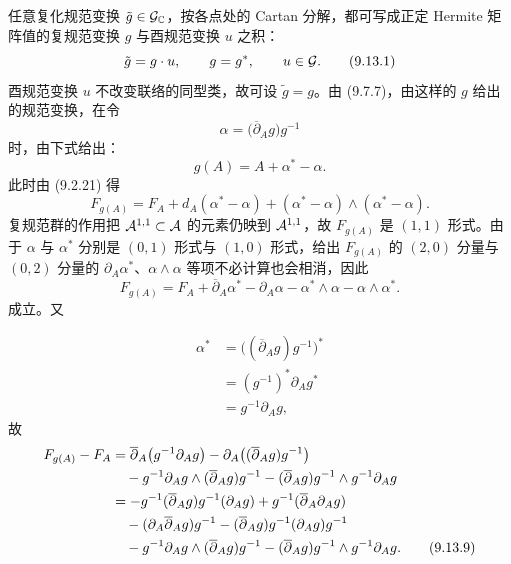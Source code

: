 任意复化规范变换 $\tilde g\in\mathcal{G}_{\mathbb{C}}$，按各点处的 Cartan 分解，都可写成正定 Hermite 矩阵值的复规范变换 $g$ 与酉规范变换 $u$ 之积：
\begin{equation}
  \tilde g=g\cdot u,\qquad g=g^*,\qquad u\in\mathcal{G}.
  \tag{9.13.1}
\end{equation}
酉规范变换 $u$ 不改变联络的同型类，故可设 $\tilde g=g$。由 (9.7.7)，由这样的 $g$ 给出的规范变换，在令
\begin{equation}
  \alpha=\bigl(\overline{\partial}_Ag\bigr)g^{-1}
  \tag{9.13.2}
\end{equation}
时，由下式给出：
\begin{equation}
  g(A)=A+\alpha^*-\alpha.
  \tag{9.13.3}
\end{equation}
此时由 (9.2.21) 得
\begin{equation}
  F_{g(A)}=F_A+d_A(\alpha^*-\alpha)+(\alpha^*-\alpha)\wedge(\alpha^*-\alpha).
  \tag{9.13.4}
\end{equation}
复规范群的作用把 $\mathcal{A}^{1,1}\subset\mathcal{A}$ 的元素仍映到 $\mathcal{A}^{1,1}$，故 $F_{g(A)}$ 是 $(1,1)$ 形式。由于 $\alpha$ 与 $\alpha^*$ 分别是 $(0,1)$ 形式与 $(1,0)$ 形式，给出 $F_{g(A)}$ 的 $(2,0)$ 分量与 $(0,2)$ 分量的 $\partial_A\alpha^*$、$\alpha\wedge\alpha$ 等项不必计算也会相消，因此
\begin{equation}
  F_{g(A)}=F_A+\overline{\partial}_A\alpha^*-\partial_A\alpha-\alpha^*\wedge\alpha-\alpha\wedge\alpha^*.
  \tag{9.13.5}
\end{equation}
成立。又

\begin{align}
  \alpha^*&=\bigl((\overline{\partial}_Ag)g^{-1}\bigr)^* \tag{9.13.6}\\
  &=(g^{-1})^*\partial_Ag^* \tag{9.13.7}\\
  &=g^{-1}\partial_Ag, \tag{9.13.8}
\end{align}
故
\begin{align}
  F_{g(A)}-F_A
  &=\overline{\partial}_A\bigl(g^{-1}\partial_Ag\bigr)-\partial_A\bigl((\overline{\partial}_Ag)g^{-1}\bigr) \notag\\
  &\quad-g^{-1}\partial_Ag\wedge(\overline{\partial}_Ag)g^{-1}-(\overline{\partial}_Ag)g^{-1}\wedge g^{-1}\partial_Ag \notag\\
  &=-g^{-1}(\overline{\partial}_Ag)g^{-1}(\partial_Ag)+g^{-1}(\overline{\partial}_A\partial_Ag) \notag\\
  &\quad-(\partial_A\overline{\partial}_Ag)g^{-1}-(\overline{\partial}_Ag)g^{-1}(\partial_Ag)g^{-1} \notag\\
  &\quad-g^{-1}\partial_Ag\wedge(\overline{\partial}_Ag)g^{-1}-(\overline{\partial}_Ag)g^{-1}\wedge g^{-1}\partial_Ag. \tag{9.13.9}
\end{align}

